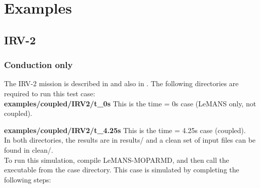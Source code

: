 \documentclass[]{article}
\begin{document}
\section{Examples}

\subsection{IRV-2}
\subsubsection{Conduction only}

The IRV-2 mission is described in \cite{kuntz} and also in \cite{wiebenga_thesis}.  The following directories are required to run this test case:
\\
\noindent \textbf{examples/coupled/IRV2/t\_0s}
This is the time = 0s case (LeMANS only, not coupled).  
 
\noindent \textbf{examples/coupled/IRV2/t\_4.25s}
This is the time = 4.25s case (coupled).  
\\

\noindent In both directories, the results are in results/ and a clean set of input files can be found in clean/.
\\

\noindent To run this simulation, compile LeMANS-MOPARMD, and then call the executable from the case directory.  This case is simulated by completing the following steps:
\end{document}
